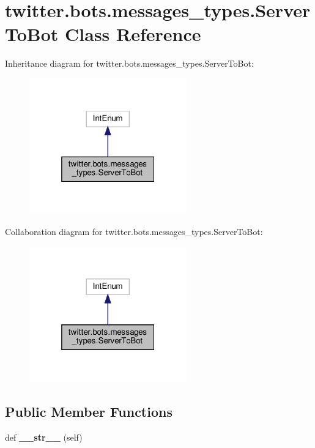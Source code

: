 \hypertarget{classtwitter_1_1bots_1_1messages__types_1_1ServerToBot}{}\section{twitter.\+bots.\+messages\+\_\+types.\+Server\+To\+Bot Class Reference}
\label{classtwitter_1_1bots_1_1messages__types_1_1ServerToBot}


Inheritance diagram for twitter.\+bots.\+messages\+\_\+types.\+Server\+To\+Bot\+:
\nopagebreak
\begin{figure}[H]
\begin{center}
\leavevmode
\includegraphics[width=193pt]{classtwitter_1_1bots_1_1messages__types_1_1ServerToBot__inherit__graph}
\end{center}
\end{figure}


Collaboration diagram for twitter.\+bots.\+messages\+\_\+types.\+Server\+To\+Bot\+:
\nopagebreak
\begin{figure}[H]
\begin{center}
\leavevmode
\includegraphics[width=193pt]{classtwitter_1_1bots_1_1messages__types_1_1ServerToBot__coll__graph}
\end{center}
\end{figure}
\subsection*{Public Member Functions}
\begin{DoxyCompactItemize}
\item 
\mbox{\label{classtwitter_1_1bots_1_1messages__types_1_1ServerToBot_a985e5ee49b6d8aec3555283ca6bf2f28}} 
def {\bfseries \+\_\+\+\_\+str\+\_\+\+\_\+} (self)
\end{DoxyCompactItemize}
